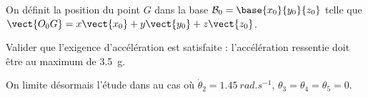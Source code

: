 \begin{multicols}{2}
On définit la position du point $G$ dans la base $\mathcal{B}_0 = \base{x_0}{y_0}{z_0}$ telle que $\vect{O_0 G} = x\vect{x_0}+y\vect{y_0}+z\vect{z_0}$.
 
\ifprof
\begin{corrige}
\end{corrige}
\else\fi


\ifprof
\begin{corrige}
\end{corrige}
\else\fi

\begin{obj}
Valider que l'exigence d'accélération est satisfaite : l'accélération ressentie doit être au maximum de \SI{3,5}{g}.
\end{obj}



\ifprof
\begin{corrige}
\end{corrige}
\else\fi

On limite désormais l'étude dans au cas où $\dot{\theta}_2 = \SI{1,45}{rad.s^{-1}}$, ${\theta}_3={\theta}_4={\theta}_5=0$.


\ifprof
\begin{corrige}
\end{corrige}
\else\fi


\ifprof
\begin{corrige}
\end{corrige}
\else\fi



\ifprof
\else
\end{multicols}
\fi


